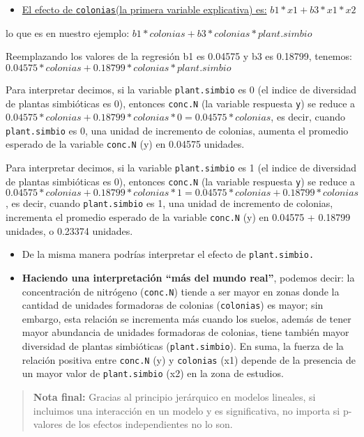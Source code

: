 \documentclass[
]{article}
\providecommand{\tightlist}{%
  \setlength{\itemsep}{0pt}\setlength{\parskip}{0pt}}
\begin{document}
\begin{itemize}
\tightlist
\item
  \underline{El efecto de \texttt{colonias}(la primera variable
  explicativa) es:} \(b1*x1+ b3*x1*x2\)
\end{itemize}

lo que es en nuestro ejemplo: \(b1*colonias + b3*colonias*plant.simbio\)

Reemplazando los valores de la regresión b1 es 0.04575 y b3 es 0.18799,
tenemos: \(0.04575*colonias + 0.18799*colonias*plant.simbio\)

Para interpretar decimos, si la variable \texttt{plant.simbio} es 0 (el
indice de diversidad de plantas simbióticas es 0), entonces
\texttt{conc.N} (la variable respuesta \texttt{y}) se reduce a
\(0.04575*colonias + 0.18799*colonias*0 = 0.04575*colonias\), es decir,
cuando \texttt{plant.simbio} es 0, una unidad de incremento de colonias,
aumenta el promedio esperado de la variable \texttt{conc.N} (y) en
0.04575 unidades.

Para interpretar decimos, si la variable \texttt{plant.simbio} es 1 (el
indice de diversidad de plantas simbióticas es 0), entonces
\texttt{conc.N} (la variable respuesta \texttt{y}) se reduce a
\(0.04575*colonias + 0.18799*colonias*1 = 0.04575*colonias + 0.18799*colonias\),
es decir, cuando \texttt{plant.simbio} es 1, una unidad de incremento de
colonias, incrementa el promedio esperado de la variable \texttt{conc.N}
(y) en 0.04575 + 0.18799 unidades, o 0.23374 unidades.

\begin{itemize}
\item
  De la misma manera podrías interpretar el efecto de
  \texttt{plant.simbio.}
\item
  \textbf{Haciendo una interpretación ``más del mundo real''}, podemos
  decir: la concentración de nitrógeno (\texttt{conc.N}) tiende a ser
  mayor en zonas donde la cantidad de unidades formadoras de colonias
  (\texttt{colonias}) es mayor; sin embargo, esta relación se incrementa
  más cuando los suelos, además de tener mayor abundancia de unidades
  formadoras de colonias, tiene también mayor diversidad de plantas
  simbióticas (\texttt{plant.simbio}). En suma, la fuerza de la relación
  positiva entre \texttt{conc.N} (y) y \texttt{colonias} (x1) depende de
  la presencia de un mayor valor de \texttt{plant.simbio} (x2) en la
  zona de estudios.
\end{itemize}

\begin{quote}
\textbf{Nota final:} Gracias al principio jerárquico en modelos
lineales, si incluimos una interacción en un modelo y es significativa,
no importa si p-valores de los efectos independientes no lo son.
\end{quote}
\end{document}
